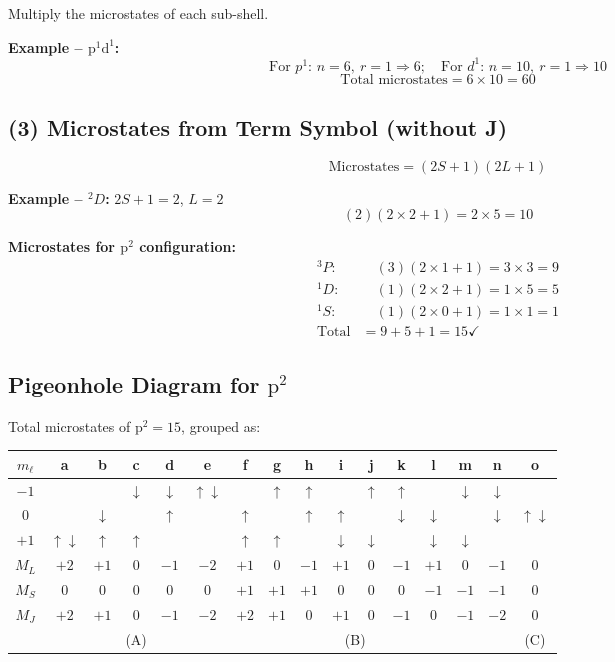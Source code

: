 \documentclass[12pt,a4paper]{article}
\begin{document}
Multiply the microstates of each sub-shell.

\textbf{Example -- $\mathrm{p}^1\mathrm{d}^1$:}
\[
\text{For } p^1\text{: } n=6,\ r=1 \Rightarrow 6; \quad \text{For } d^1\text{: } n=10,\ r=1 \Rightarrow 10
\]
\[
\text{Total microstates} = 6 \times 10 = 60
\]

\subsection{(3) Microstates from Term Symbol (without J)}

\[
\text{Microstates} = (2S+1)(2L+1)
\]

\textbf{Example -- ${}^2D$:} $2S+1=2$, $L=2$
\[
(2)(2\times2+1) = 2 \times 5 = 10
\]

\textbf{Microstates for $\mathrm{p}^2$ configuration:}
\begin{align*}
{}^3P: &\quad (3)(2\times1+1) = 3\times3 = 9 \\
{}^1D: &\quad (1)(2\times2+1) = 1\times5 = 5 \\
{}^1S: &\quad (1)(2\times0+1) = 1\times1 = 1 \\
\text{Total} &= 9+5+1 = 15 \checkmark
\end{align*}

\subsection{Pigeonhole Diagram for $\mathrm{p}^2$}

Total microstates of $\mathrm{p}^2 = 15$, grouped as:

\begin{table}[H]
\centering
\small
\begin{tabular}{c|ccccc|ccc|ccc|ccc|c}
\toprule
$m_\ell$ & a & b & c & d & e & f & g & h & i & j & k & l & m & n & o \\
\midrule
$-1$ & & & $\downarrow$ & $\downarrow$ & $\uparrow\downarrow$ &  & $\uparrow$ & $\uparrow$ &  & $\uparrow$ & $\uparrow$ & & $\downarrow$ & $\downarrow$ & \\
$0$ & & $\downarrow$ &  & $\uparrow$ &  & $\uparrow$ &  & $\uparrow$ & $\uparrow$ &  & $\downarrow$ & $\downarrow$ &  & $\downarrow$ & $\uparrow\downarrow$ \\
$+1$ & $\uparrow\downarrow$ & $\uparrow$ & $\uparrow$ &  & & $\uparrow$ & $\uparrow$ &  & $\downarrow$ & $\downarrow$ &  & $\downarrow$ & $\downarrow$ &  & \\
\midrule
$M_L$ & $+2$ & $+1$ & $0$ & $-1$ & $-2$ & $+1$ & $0$ & $-1$ & $+1$ & $0$ & $-1$ & $+1$ & $0$ & $-1$ & $0$ \\
$M_S$ & $0$ & $0$ & $0$ & $0$ & $0$ & $+1$ & $+1$ & $+1$ & $0$ & $0$ & $0$ & $-1$ & $-1$ & $-1$ & $0$ \\
$M_J$ & $+2$ & $+1$ & 0 & $-1$ & $-2$ & $+2$ & $+1$ & $0$ & $+1$ & $0$ & $-1$ & $0$ & $-1$ & $-2$ & $0$ \\
\midrule
& & & (A) &  & & \multicolumn{8}{c}{(B)} & & (C) \\
\bottomrule
\end{tabular}
\end{table}
\end{document}
